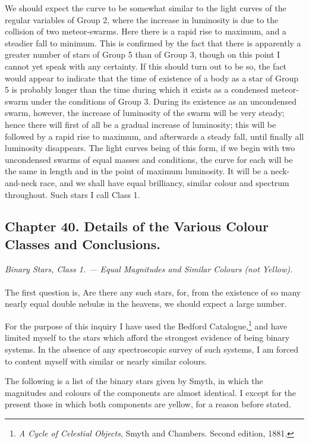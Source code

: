 \documentclass[a4paper, 12pt, oneside, polutonikogreek, english]{article}
\begin{document}
We should expect the curve to be somewhat similar to the light curves of the regular variables of Group 2, where the increase in luminosity is due to the collision of two meteor-swarms. Here there is a rapid rise to maximum, and a steadier fall to minimum. This is confirmed by the fact that there is apparently a greater number of stars of Group 5 than of Group 3, though on this point I cannot yet speak with any certainty. If this should turn out to be so, the fact would appear to indicate that the time of existence of a body as a star of Group 5 is probably longer than the time during which it exists as a condensed meteor-swarm under the conditions of Group 3. During its existence as an uncondensed swarm, however, the increase of luminosity of the swarm will be very steady; hence there will first of all be a gradual increase of luminosity; this will be followed by a rapid rise to maximum, and afterwards a steady fall, until finally all luminosity disappears. The light curves being of this form, if we begin with two uncondensed swarms of equal masses and conditions, the curve for each will be the same in length and in the point of maximum luminosity. It will be a neck-and-neck race, and we shall have equal brilliancy, similar colour and spectrum throughout. Such stars I call Class 1.
\clearpage
\subsection{Chapter 40. Details of the Various Colour Classes and Conclusions.}
\begin{center}
\emph{Binary Stars, Class 1. --- Equal Magnitudes and Similar Colours (not Yellow).}
\end{center}
\paragraph{}
The first question is, Are there any such stars, for, from the existence of so many nearly equal double nebulæ in the heavens, we should expect a large number.

For the purpose of this inquiry I have used the Bedford Catalogue,\footnote{\emph{A Cycle of Celestial Objects}, Smyth and Chambers. Second edition, 1881.} and have limited myself to the stars which afford the strongest evidence of being binary systems. In the absence of any spectroscopic survey of such systems, I am forced to content myself with similar or nearly similar colours.

The following is a list of the binary stars given by Smyth, in which the magnitudes and colours of the components are almost identical. I except for the present those in which both components are yellow, for a reason before stated.
\end{document}
